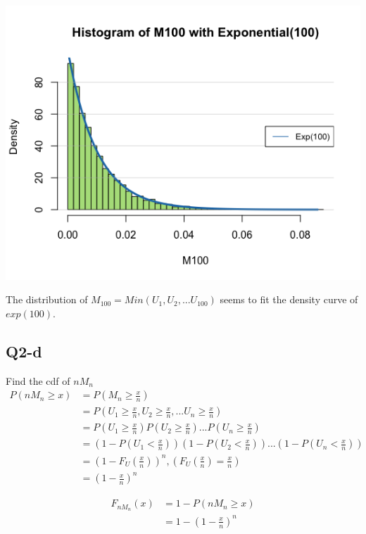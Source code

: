\documentclass[12pt,letterpaper]{article}
\begin{document}
\includegraphics[width=150mm]{hist-exp100.png}

\noindent The distribution of $M_{100} = Min(U_1, U_2, ... U_100)$ seems to fit the density curve of $exp(100)$.

\newpage
\subsection*{Q2-d}

\noindent Find the cdf of $nM_n$
\begin{align*}
P(nM_n \geq x) &= P(M_n \geq \frac{x}{n}) \\
&= P(U_1 \geq \frac{x}{n}, U_2 \geq \frac{x}{n}, ... U_n \geq \frac{x}{n}) \\
&= P(U_1 \geq \frac{x}{n})P(U_2 \geq \frac{x}{n}) ... P(U_n \geq \frac{x}{n}) \\
&= (1 - P(U_1 < \frac{x}{n}) ) (1 - P(U_2 < \frac{x}{n}) ) ...  (1 - P(U_n < \frac{x}{n}) ) \\
&= (1 - F_U(\frac{x}{n}))^n,  (F_U(\frac{x}{n}) = \frac{x}{n}) \\
&= (1 - \frac{x}{n})^n
\end{align*}

\begin{align*}
F_{nM_n}(x) &= 1 - P(nM_n \geq x) \\
&= 1 - (1-\frac{x}{n})^n 
\end{align*}
\end{document}

